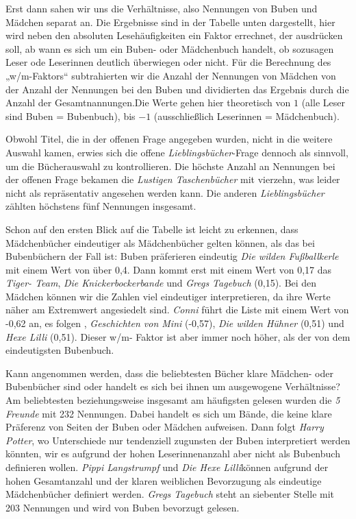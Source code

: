 Erst dann sahen wir uns die Verhältnisse, also Nennungen von Buben und
Mädchen separat an. Die Ergebnisse sind in der Tabelle unten
dargestellt, hier wird neben den absoluten Lesehäufigkeiten ein Faktor
errechnet, der ausdrücken soll, ab wann es sich um ein Buben- oder
Mädchenbuch handelt, ob sozusagen Leser ode Leserinnen deutlich
überwiegen oder nicht. Für die Berechnung des „w/m-Faktors``
subtrahierten wir die Anzahl der Nennungen von Mädchen von der Anzahl
der Nennungen bei den Buben und dividierten das Ergebnis durch die
Anzahl der Gesamtnannungen.Die Werte gehen hier theoretisch von $1$
(alle Leser sind Buben = Bubenbuch), bis $-1$ (ausschließlich Leserinnen
= Mädchenbuch).



Obwohl Titel, die in der offenen Frage angegeben wurden, nicht in die
weitere Auswahl kamen, erwies sich die offene
\emph{Lieblingsbücher}-Frage dennoch als sinnvoll, um die Bücherauswahl
zu kontrollieren. Die höchste Anzahl an Nennungen bei der offenen Frage
bekamen die \emph{Lustigen Taschenbücher} mit vierzehn, was leider nicht
als repräsentativ angesehen werden kann. Die anderen
\emph{Lieblingsbücher} zählten höchstens fünf Nennungen insgesamt.

Schon auf den ersten Blick auf die Tabelle ist leicht zu erkennen, dass
Mädchenbücher eindeutiger als Mädchenbücher gelten können, als das bei
Bubenbüchern der Fall ist: Buben präferieren eindeutig \emph{Die wilden
Fußballkerle} mit einem Wert von über 0,4. Dann kommt erst mit einem
Wert von 0,17 das \emph{Tiger- Team}, \emph{Die Knickerbockerbande} und
\emph{Gregs Tagebuch} (0,15). Bei den Mädchen können wir die Zahlen viel
eindeutiger interpretieren, da ihre Werte näher am Extremwert
angesiedelt sind. \emph{Conni} führt die Liste mit einem Wert von -0,62
an, es folgen , \emph{Geschichten von Mini} (-0,57), \emph{Die wilden
Hühner} (0,51) und \emph{Hexe Lilli} (0,51). Dieser w/m- Faktor ist aber
immer noch höher, als der von dem eindeutigsten Bubenbuch.

Kann angenommen werden, dass die beliebtesten Bücher klare Mädchen- oder
Bubenbücher sind oder handelt es sich bei ihnen um ausgewogene
Verhältnisse? Am beliebtesten beziehungsweise insgesamt am häufigsten
gelesen wurden die \emph{5 Freunde} mit 232 Nennungen. Dabei handelt es
sich um Bände, die keine klare Präferenz von Seiten der Buben oder
Mädchen aufweisen. Dann folgt \emph{Harry Potter}, wo Unterschiede nur
tendenziell zugunsten der Buben interpretiert werden könnten, wir es
aufgrund der hohen Leserinnenanzahl aber nicht als Bubenbuch definieren
wollen. \emph{Pippi Langstrumpf} und \emph{Die Hexe Lilli}können
aufgrund der hohen Gesamtanzahl und der klaren weiblichen Bevorzugung
als eindeutige Mädchenbücher definiert werden. \emph{Gregs Tagebuch}
steht an siebenter Stelle mit 203 Nennungen und wird von Buben bevorzugt
gelesen.

